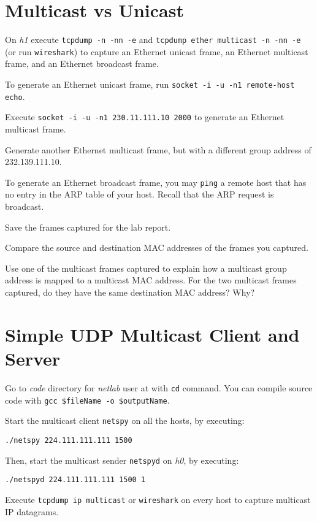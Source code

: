 \documentclass{../UTNetLab}
\begin{document}
\section{Multicast vs Unicast}
    On \textit{h1} execute \lstinline{tcpdump -n -nn -e} and \lstinline{tcpdump ether multicast -n -nn -e} (or run \lstinline{wireshark}) to capture an Ethernet unicast frame, an Ethernet multicast frame, and an Ethernet broadcast frame.

    To generate an Ethernet unicast frame, run \lstinline[emph={your-host, remote-host}]{socket -i -u -n1 remote-host echo}.

    Execute \lstinline{socket -i -u -n1 230.11.111.10 2000} to generate an Ethernet multicast frame.

    Generate another Ethernet multicast frame, but with a different group address of {232.139.111.10}.

    To generate an Ethernet broadcast frame, you may \lstinline{ping} a remote host that has no entry in the ARP table of your host.
    Recall that the ARP request is broadcast.

    Save the frames captured for the lab report.

    \begin{report}
        \item Compare the source and destination MAC addresses of the frames you captured.

        \item Use one of the multicast frames captured to explain how a multicast group address is mapped to a multicast MAC address.
            For the two multicast frames captured, do they have the same destination MAC address?
            Why?
    \end{report}

\section{Simple UDP Multicast Client and Server}
    Go to \textit{code} directory for \textit{netlab} user at  with \lstinline{cd} command.
    You can compile source code with \lstinline[emph={$fileName, $outputName}]{gcc $fileName -o $outputName}.

    Start the multicast client \lstinline{netspy} on all the hosts, by executing:
    \begin{lstlisting}
./netspy 224.111.111.111 1500
    \end{lstlisting}
    Then, start the multicast sender \lstinline{netspyd} on \textit{h0}, by executing:
    \begin{lstlisting}
./netspyd 224.111.111.111 1500 1
    \end{lstlisting}
    Execute \lstinline{tcpdump ip multicast} or \lstinline{wireshark} on every host to capture multicast IP datagrams.
\end{document}
